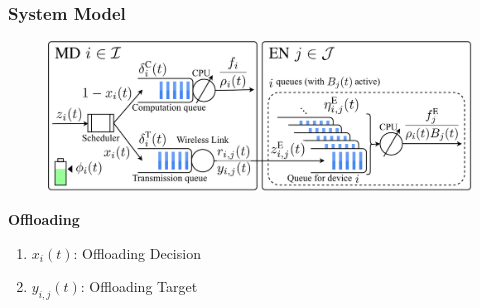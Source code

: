 \begin{frame}
	\frametitle{System Model}
	
	\begin{figure}
		\captionsetup{name=Fig.}
		\centering
		\includegraphics[width=1\linewidth]{queue}
		\vspace*{-5mm}
		\vspace*{-3mm}
		\label{fig1}
	\end{figure}
	
	\vfill
	
	\textbf{Offloading}\vspace{2mm}
	
	\begin{enumerate}[$\bullet$]
		
		\item $x_i(t)$:    Offloading Decision 
		\item $y_{i,j}(t)$:   Offloading Target  
		
	\end{enumerate}


\end{frame}




